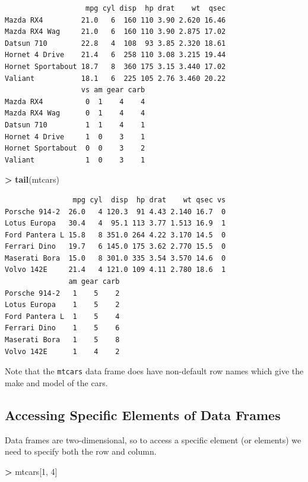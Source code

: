 \documentclass[]{krantz}
\makeatletter
\newenvironment{Shaded}{\begin{snugshade}}{\end{snugshade}}
\newcommand{\DecValTok}[1]{\textcolor[rgb]{0.06,0.06,0.06}{#1}}
\newcommand{\KeywordTok}[1]{\textcolor[rgb]{0.27,0.27,0.27}{\textbf{#1}}}
\newcommand{\NormalTok}[1]{#1}
\newcommand{\OperatorTok}[1]{\textcolor[rgb]{0.43,0.43,0.43}{\textbf{#1}}}
\newcommand{\StringTok}[1]{\textcolor[rgb]{0.5,0.5,0.5}{#1}}
\newenvironment{kframe}{%
\medskip{}
\setlength{\fboxsep}{.8em}
 \def\at@end@of@kframe{}%
 \ifinner\ifhmode%
  \def\at@end@of@kframe{\end{minipage}}%
  \begin{minipage}{\columnwidth}%
 \fi\fi%
 \def\FrameCommand##1{\hskip\@totalleftmargin \hskip-\fboxsep
 \colorbox{shadecolor}{##1}\hskip-\fboxsep
     \hskip-\linewidth \hskip-\@totalleftmargin \hskip\columnwidth}%
 \MakeFramed {\advance\hsize-\width
   \@totalleftmargin\z@ \linewidth\hsize
   \@setminipage}}%
 {\par\unskip\endMakeFramed%
 \at@end@of@kframe}
\renewenvironment{Shaded}{\begin{kframe}}{\end{kframe}}
\makeatother
\begin{document}
\begin{verbatim}
                   mpg cyl disp  hp drat    wt  qsec
Mazda RX4         21.0   6  160 110 3.90 2.620 16.46
Mazda RX4 Wag     21.0   6  160 110 3.90 2.875 17.02
Datsun 710        22.8   4  108  93 3.85 2.320 18.61
Hornet 4 Drive    21.4   6  258 110 3.08 3.215 19.44
Hornet Sportabout 18.7   8  360 175 3.15 3.440 17.02
Valiant           18.1   6  225 105 2.76 3.460 20.22
                  vs am gear carb
Mazda RX4          0  1    4    4
Mazda RX4 Wag      0  1    4    4
Datsun 710         1  1    4    1
Hornet 4 Drive     1  0    3    1
Hornet Sportabout  0  0    3    2
Valiant            1  0    3    1
\end{verbatim}

\begin{Shaded}
\begin{Highlighting}[]
\OperatorTok{>}\StringTok{ }\KeywordTok{tail}\NormalTok{(mtcars)}
\end{Highlighting}
\end{Shaded}

\begin{verbatim}
                mpg cyl  disp  hp drat    wt qsec vs
Porsche 914-2  26.0   4 120.3  91 4.43 2.140 16.7  0
Lotus Europa   30.4   4  95.1 113 3.77 1.513 16.9  1
Ford Pantera L 15.8   8 351.0 264 4.22 3.170 14.5  0
Ferrari Dino   19.7   6 145.0 175 3.62 2.770 15.5  0
Maserati Bora  15.0   8 301.0 335 3.54 3.570 14.6  0
Volvo 142E     21.4   4 121.0 109 4.11 2.780 18.6  1
               am gear carb
Porsche 914-2   1    5    2
Lotus Europa    1    5    2
Ford Pantera L  1    5    4
Ferrari Dino    1    5    6
Maserati Bora   1    5    8
Volvo 142E      1    4    2
\end{verbatim}

Note that the \texttt{mtcars} data frame does have non-default row names which give the make and model of the cars.

\hypertarget{accessing-specific-elements-of-data-frames}{%
\subsection{Accessing Specific Elements of Data Frames}\label{accessing-specific-elements-of-data-frames}}

Data frames are two-dimensional, so to access a specific element (or elements) we need to specify both the row and column.

\begin{Shaded}
\begin{Highlighting}[]
\OperatorTok{>}\StringTok{ }\NormalTok{mtcars[}\DecValTok{1}\NormalTok{, }\DecValTok{4}\NormalTok{]}
\end{Highlighting}
\end{Shaded}
\end{document}
